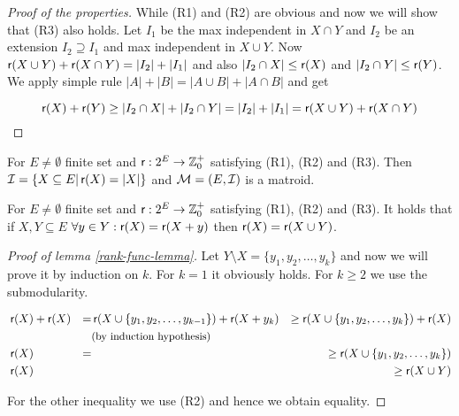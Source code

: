 \begin{proof}[Proof of the properties]
	While (R1) and (R2) are obvious and now we will show that (R3) also holds. Let $I_1$ be the max independent in $X \cap Y$ and $I_2$ be an extension $I_2 \supseteq I_1$ and max independent in $X \cup Y$. Now $\operatorname{\textsf{r}}(X \cup Y) + \operatorname{\textsf{r}}(X \cap Y) = \left|{I_2}\right| + \left|{I_1}\right|$ and also $|I_2 \cap X| \leq \operatorname{\textsf{r}}(X)$ and $|I_2 \cap Y| \leq \operatorname{\textsf{r}}(Y)$. We apply simple rule $|A| + |B| = |A \cup B| + |A \cap B|$ and get
	
	$$
	\operatorname{\textsf{r}}(X) + \operatorname{\textsf{r}}(Y) \geq |I_2 \cap X| + |I_2 \cap Y| = |I_2| + |I_1| = \operatorname{\textsf{r}}(X \cup Y) + \operatorname{\textsf{r}}(X \cap Y)
	$$
\end{proof}

\begin{thm}
	For $E \neq \emptyset$ finite set and $\operatorname{\textsf{r}}: 2^E \to \mathbb{Z}^+_0$ satisfying (R1), (R2) and (R3). Then $\mathcal{I} = \{X \subseteq E | \operatorname{\textsf{r}}(X) = |X| \}$ and $\mathcal{M} = (E, \mathcal{I})$ is a matroid.
	\label{rank-func-thm}
\end{thm}

\begin{lemma}
	For $E \neq \emptyset$ finite set and $\operatorname{\textsf{r}}: 2^E \to \mathbb{Z}^+_0$ satisfying (R1), (R2) and (R3). It holds that if $X, Y \subseteq E$ $\forall y \in Y: \operatorname{\textsf{r}}(X) = \operatorname{\textsf{r}}(X + y)$ then $\operatorname{\textsf{r}}(X) = \operatorname{\textsf{r}}(X \cup Y)$.
	\label{rank-func-lemma}
\end{lemma}

\begin{proof}[Proof of lemma \ref{rank-func-lemma}]
	Let $Y \setminus X = \{y_1, y_2, \dots, y_k\}$ and now we will prove it by induction on $k$. For $k = 1$ it obviously holds. For $k \geq 2$ we use the submodularity.
	
	$$
	\begin{aligned}
		&\operatorname{\textsf{r}}(X) + \operatorname{\textsf{r}}(X) &= &\operatorname{\textsf{r}}(X \cup \{y_1, y_2, \dots, y_{k-1}\}) + \operatorname{\textsf{r}}(X + y_k) &\geq \operatorname{\textsf{r}}(X \cup \{y_1, y_2, \dots, y_k\}) + \operatorname{\textsf{r}}(X)\\
		&                    &  & \text{\small{(by induction hypothesis)}}\\
		&\operatorname{\textsf{r}}(X)            &= &                                                            &\geq \operatorname{\textsf{r}}(X \cup \{y_1, y_2, \dots, y_k\})\\
		&\operatorname{\textsf{r}}(X)            &  &                                                            &\geq \operatorname{\textsf{r}}(X \cup Y)\\
	\end{aligned}
	$$
	
	\noindent For the other inequality we use (R2) and hence we obtain equality.
\end{proof}

